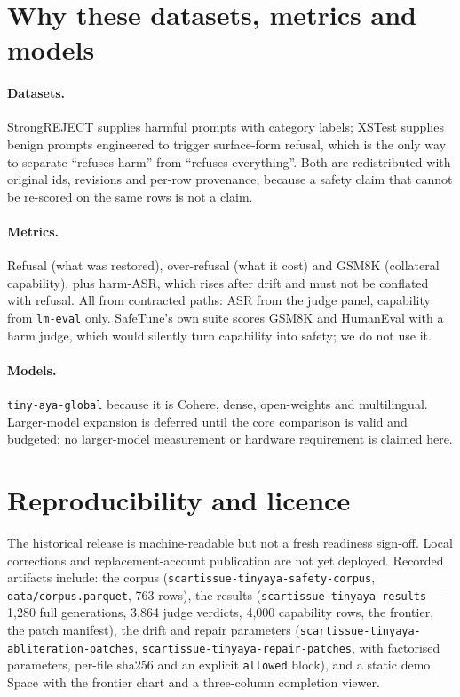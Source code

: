 \documentclass[10pt,a4paper]{article}
\newcommand{\code}[1]{\texttt{\small #1}}
\begin{document}
\section{Why these datasets, metrics and models}

\paragraph{Datasets.} StrongREJECT supplies harmful prompts with category labels; XSTest supplies
benign prompts engineered to trigger surface-form refusal, which is the only way to separate
``refuses harm'' from ``refuses everything''. Both are redistributed with original ids, revisions and
per-row provenance, because a safety claim that cannot be re-scored on the same rows is not a claim.

\paragraph{Metrics.} Refusal (what was restored), over-refusal (what it cost) and GSM8K (collateral
capability), plus harm-ASR, which rises after drift and must not be conflated with refusal. All from contracted paths: ASR from the judge panel, capability from \code{lm-eval} only.
SafeTune's own suite scores GSM8K and HumanEval with a harm judge, which would silently turn
capability into safety; we do not use it.

\paragraph{Models.} \code{tiny-aya-global} because it is Cohere, dense, open-weights and multilingual.
Larger-model expansion is deferred until the core comparison is valid and budgeted; no larger-model
measurement or hardware requirement is claimed here.

\section{Reproducibility and licence}

The historical release is machine-readable but not a fresh readiness sign-off. Local corrections
and replacement-account publication are not yet deployed. Recorded artifacts include: the corpus (\code{scartissue-tinyaya-safety-corpus},
\code{data/corpus.parquet}, 763 rows), the results (\code{scartissue-tinyaya-results} --- 1{,}280 full
generations, 3{,}864 judge verdicts, 4{,}000 capability rows, the frontier, the patch manifest), the
drift and repair parameters (\code{scartissue-tinyaya-abliteration-patches},
\code{scartissue-tinyaya-repair-patches}, with factorised parameters, per-file sha256 and an explicit
\code{allowed} block), and a static demo Space with the frontier chart and a three-column completion
viewer.
\end{document}

